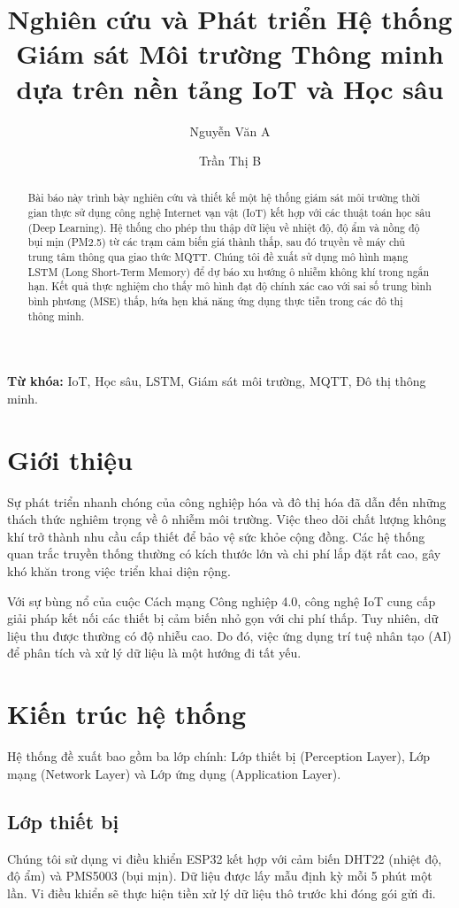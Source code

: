 \documentclass[11pt,a4paper]{article} %
\title{\textbf{Nghiên cứu và Phát triển Hệ thống Giám sát Môi trường Thông minh dựa trên nền tảng IoT và Học sâu}}
\author[1]{Nguyễn Văn A}
\author[2]{Trần Thị B}
\affil[1,2]{Khoa Công nghệ Thông tin, Đại học Bách khoa Hà Nội}
\affil[ ]{Email: \{anv, btt\}@hust.edu.vn}
\date{}
\begin{document}
\maketitle

\begin{abstract}
Bài báo này trình bày nghiên cứu và thiết kế một hệ thống giám sát môi trường thời gian thực sử dụng công nghệ Internet vạn vật (IoT) kết hợp với các thuật toán học sâu (Deep Learning). Hệ thống cho phép thu thập dữ liệu về nhiệt độ, độ ẩm và nồng độ bụi mịn (PM2.5) từ các trạm cảm biến giá thành thấp, sau đó truyền về máy chủ trung tâm thông qua giao thức MQTT. Chúng tôi đề xuất sử dụng mô hình mạng LSTM (Long Short-Term Memory) để dự báo xu hướng ô nhiễm không khí trong ngắn hạn. Kết quả thực nghiệm cho thấy mô hình đạt độ chính xác cao với sai số trung bình bình phương (MSE) thấp, hứa hẹn khả năng ứng dụng thực tiễn trong các đô thị thông minh.
\end{abstract}

\textbf{Từ khóa:} IoT, Học sâu, LSTM, Giám sát môi trường, MQTT, Đô thị thông minh.

\section{Giới thiệu}
Sự phát triển nhanh chóng của công nghiệp hóa và đô thị hóa đã dẫn đến những thách thức nghiêm trọng về ô nhiễm môi trường. Việc theo dõi chất lượng không khí trở thành nhu cầu cấp thiết để bảo vệ sức khỏe cộng đồng. Các hệ thống quan trắc truyền thống thường có kích thước lớn và chi phí lắp đặt rất cao, gây khó khăn trong việc triển khai diện rộng.

Với sự bùng nổ của cuộc Cách mạng Công nghiệp 4.0, công nghệ IoT cung cấp giải pháp kết nối các thiết bị cảm biến nhỏ gọn với chi phí thấp. Tuy nhiên, dữ liệu thu được thường có độ nhiễu cao. Do đó, việc ứng dụng trí tuệ nhân tạo (AI) để phân tích và xử lý dữ liệu là một hướng đi tất yếu.

\section{Kiến trúc hệ thống}
Hệ thống đề xuất bao gồm ba lớp chính: Lớp thiết bị (Perception Layer), Lớp mạng (Network Layer) và Lớp ứng dụng (Application Layer).

\subsection{Lớp thiết bị}
Chúng tôi sử dụng vi điều khiển ESP32 kết hợp với cảm biến DHT22 (nhiệt độ, độ ẩm) và PMS5003 (bụi mịn). Dữ liệu được lấy mẫu định kỳ mỗi 5 phút một lần. Vi điều khiển sẽ thực hiện tiền xử lý dữ liệu thô trước khi đóng gói gửi đi.
\end{document}
